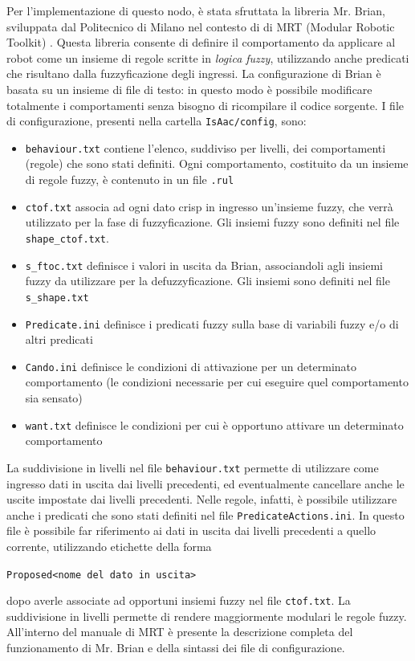 Per l'implementazione di questo nodo, è stata sfruttata la libreria Mr. Brian, sviluppata dal Politecnico di Milano nel contesto di di MRT (Modular Robotic Toolkit) \cite{mrt}. Questa libreria consente di definire il comportamento da applicare al robot come un insieme di regole scritte in \emph{logica fuzzy}, utilizzando anche predicati che risultano dalla fuzzyficazione degli ingressi. La configurazione di Brian è basata su un insieme di file di testo: in questo modo è possibile modificare totalmente i comportamenti senza bisogno di ricompilare il codice sorgente. I file di configurazione, presenti nella cartella \verb|IsAac/config|, sono:
\begin{itemize}
\item \verb|behaviour.txt| contiene l'elenco, suddiviso per livelli, dei comportamenti (regole) che sono stati definiti. Ogni comportamento, costituito da un insieme di regole fuzzy, è contenuto in un file \verb|.rul|
\item \verb|ctof.txt| associa ad ogni dato crisp in ingresso un'insieme fuzzy, che verrà utilizzato per la fase di fuzzyficazione. Gli insiemi fuzzy sono definiti nel file \verb|shape_ctof.txt|.
\item \verb|s_ftoc.txt| definisce i valori in uscita da Brian, associandoli agli insiemi fuzzy da utilizzare per la defuzzyficazione. Gli insiemi sono definiti nel file \verb|s_shape.txt|
\item \verb|Predicate.ini| definisce i predicati fuzzy sulla base di variabili fuzzy e/o di altri predicati
\item \verb|Cando.ini| definisce le condizioni di attivazione per un determinato comportamento (le condizioni necessarie per cui eseguire quel comportamento sia sensato)
\item \verb|want.txt| definisce le condizioni per cui è opportuno attivare un determinato comportamento
\end{itemize}
La suddivisione in livelli nel file \verb|behaviour.txt| permette di utilizzare come ingresso dati in uscita dai livelli precedenti, ed eventualmente cancellare anche le uscite impostate dai livelli precedenti. Nelle regole, infatti, è possibile utilizzare anche i predicati che sono stati definiti nel file \verb|PredicateActions.ini|. In questo file è possibile far riferimento ai dati in uscita dai livelli precedenti a quello corrente, utilizzando etichette della forma
\begin{center}\verb|Proposed<nome del dato in uscita>|\end{center}
dopo averle associate ad opportuni insiemi fuzzy nel file \verb|ctof.txt|. La suddivisione in livelli permette di rendere maggiormente modulari le regole fuzzy. All'interno del manuale di MRT \cite{mrtmanual} è presente la descrizione completa del funzionamento di Mr. Brian e della sintassi dei file di configurazione.

